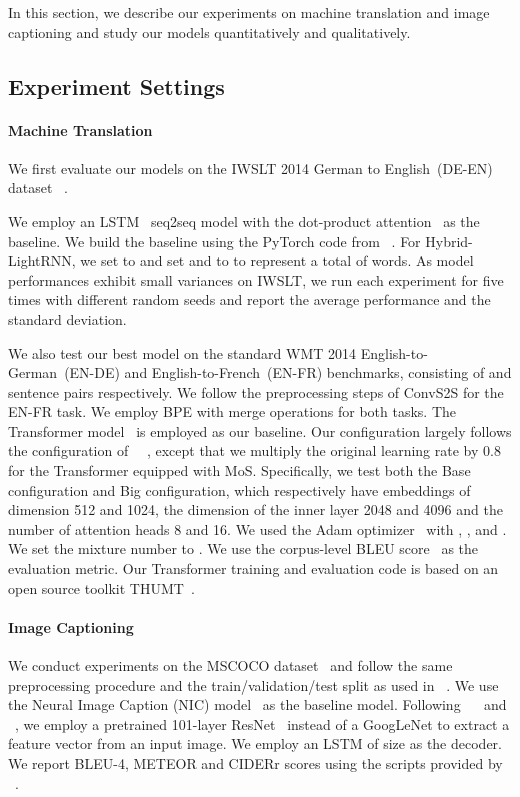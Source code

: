 \documentclass[letterpaper]{article} \usepackage{aaai19}  \usepackage{times}  \usepackage{helvet}  \usepackage{courier}  \usepackage{url}  \usepackage{graphicx}  \frenchspacing  \usepackage{booktabs}
\begin{document}
In this section, we describe our experiments on machine translation and image captioning and study our models quantitatively and qualitatively. 
\subsection{Experiment Settings}
\paragraph{Machine Translation}
We first evaluate our models on the IWSLT 2014 German to English~(DE-EN) dataset ~\cite{cettolo2013report}. 

We employ an LSTM~\cite{hochreiter1997long} seq2seq model with the dot-product attention~\cite{bahdanau2014neural,luong2015effective} as the baseline. We build the baseline using the PyTorch code from \citeauthor{dai2018credit}~. For Hybrid-LightRNN, we set  to  and set  and  to  to represent a total of  words. As model performances exhibit small variances on IWSLT, we run each experiment for five times with different random seeds and report the average performance and the standard deviation.

We also test our best model on the standard WMT 2014 English-to-German~(EN-DE) and English-to-French~(EN-FR) benchmarks, consisting of  and  sentence pairs respectively. We follow the preprocessing steps of ConvS2S \cite{gehring2017convolutional} for the EN-FR task.
We employ BPE with  merge operations for both tasks.  The Transformer model~\cite{vaswani2017attention} is employed as our baseline. Our configuration largely follows the configuration of ~\citeauthor{vaswani2017attention}~, except that we multiply the original learning rate by 0.8 for the Transformer equipped with MoS.  Specifically, we test both the Base configuration and Big configuration, which respectively have embeddings of dimension 512 and 1024, the dimension of the inner layer 2048 and 4096 and the number of attention heads 8 and 16. We used the Adam optimizer~\cite{kingma2014adam} with , , and  .
We set the mixture number to . We use the corpus-level BLEU score~\cite{papineni2002bleu} as the evaluation metric. Our Transformer training and evaluation code is based on an open source toolkit THUMT~\cite{zhang2017thumt}.


\paragraph{Image Captioning} We conduct experiments on the MSCOCO dataset~\cite{lin2014microsoft} and follow the same preprocessing procedure and the train/validation/test split as used in \citeauthor{karpathy2015deep}~.
We use the Neural Image Caption (NIC) model~\cite{vinyals2015show} as the baseline model. Following ~\citeauthor{dai2018credit}~ and \citeauthor{kong2018neural}~, we employ a pretrained 101-layer ResNet~\cite{he2016deep} instead of a GoogLeNet to extract a feature vector from an input image. We employ an LSTM of size  as the decoder.
We report BLEU-4, METEOR and CIDERr scores using the scripts provided by \citeauthor{chen2015microsoft}~.
\end{document}
